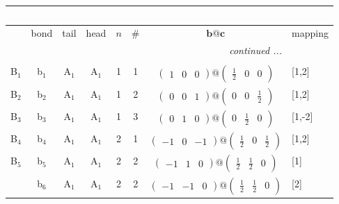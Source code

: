 \documentclass[fleqn,10pt,landscape]{article}
\begin{document}
\begin{itemize}
\begin{center}
\begin{longtable}{cc|cc|c|c|c|l}
\multicolumn{7}{l}{\tablename\ \thetable{}} \\
 \hline \hline
 & bond & tail & head & $n$ & \# & $\bm{b}@\bm{c}$ & mapping \\ \hline \endhead

 \hline \hline
\multicolumn{7}{r}{\footnotesize\it continued ...} \\ \endfoot

 \hline \hline
\multicolumn{7}{r}{} \\ \endlastfoot

B$_{1}$ & b$_{1}$ & A$_{1}$ & A$_{1}$ & 1 & 1 & $\begin{pmatrix} 1 & 0 & 0 \end{pmatrix}@\begin{pmatrix} \frac{1}{2} & 0 & 0 \end{pmatrix}$ & [1,2] \\ \hline
B$_{2}$ & b$_{2}$ & A$_{1}$ & A$_{1}$ & 1 & 2 & $\begin{pmatrix} 0 & 0 & 1 \end{pmatrix}@\begin{pmatrix} 0 & 0 & \frac{1}{2} \end{pmatrix}$ & [1,2] \\ \hline
B$_{3}$ & b$_{3}$ & A$_{1}$ & A$_{1}$ & 1 & 3 & $\begin{pmatrix} 0 & 1 & 0 \end{pmatrix}@\begin{pmatrix} 0 & \frac{1}{2} & 0 \end{pmatrix}$ & [1,-2] \\ \hline
B$_{4}$ & b$_{4}$ & A$_{1}$ & A$_{1}$ & 2 & 1 & $\begin{pmatrix} -1 & 0 & -1 \end{pmatrix}@\begin{pmatrix} \frac{1}{2} & 0 & \frac{1}{2} \end{pmatrix}$ & [1,2] \\ \hline
B$_{5}$ & b$_{5}$ & A$_{1}$ & A$_{1}$ & 2 & 2 & $\begin{pmatrix} -1 & 1 & 0 \end{pmatrix}@\begin{pmatrix} \frac{1}{2} & \frac{1}{2} & 0 \end{pmatrix}$ & [1] \\
& b$_{6}$ & A$_{1}$ & A$_{1}$ & 2 & 2 & $\begin{pmatrix} -1 & -1 & 0 \end{pmatrix}@\begin{pmatrix} \frac{1}{2} & \frac{1}{2} & 0 \end{pmatrix}$ & [2] \\ \hline

\end{longtable}
\end{center}
\end{itemize}
\end{document}
